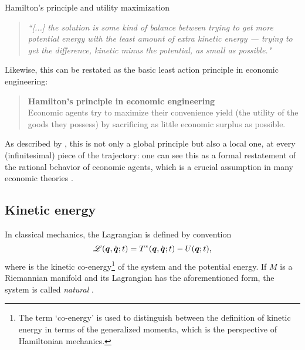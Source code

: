 \begin{econ}{Hamilton's principle and utility maximization}
    \begin{quote}
        \emph{``[...] the solution is some kind of balance between trying to get more potential energy with the least amount of extra kinetic energy — trying to get the difference, kinetic minus the potential, as small as possible."}
    \end{quote}
    Likewise, this can be restated as the basic least action principle in economic engineering:
    \begin{quote}
        \textbf{Hamilton's principle in economic engineering}\\ Economic agents try  to maximize their convenience yield (the utility of the goods they possess) by sacrificing as little  economic surplus as possible.
    \end{quote}
    As described by \citet{Feynman2010}, this is not only a global principle but also a local one, at every (infinitesimal) piece of the trajectory: one can see this as a formal restatement of the rational behavior of economic agents, which is a crucial assumption in many economic theories \cite{Mankiw2017}.
\end{econ}

\subsection{Kinetic energy}
In classical mechanics, the Lagrangian is defined by convention
\[\mathscr{L}(\vb*{q},\dot{\vb*{q}}; t) = T^*(\vb*{q},\dot{\vb*{q}}; t) - U(\vb*{q}; t),\] 
where  is the kinetic co-energy\footnote{The term `co-energy' is used to distinguish between the definition of kinetic energy in terms of the generalized momenta, which is the perspective of Hamiltonian mechanics.} of the system and  the potential energy. If \(M\) is a Riemannian manifold and its Lagrangian has the aforementioned form, the system is called \emph{natural} \cite{Arnold1989}.

